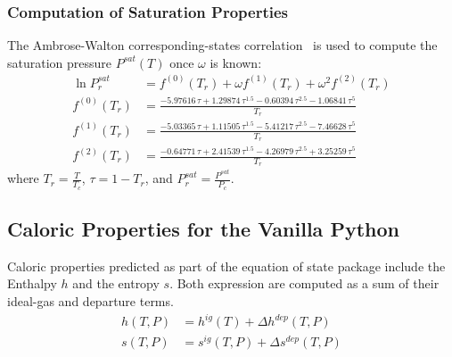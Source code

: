 \documentclass{article}
\begin{document}
\subsubsection{Computation of Saturation Properties}\label{sec:ambrose_walton}
The Ambrose-Walton corresponding-states correlation~\cite{ambrosewalton1989}
is used to compute the saturation pressure $P^{sat}(T)$ once $\omega$ is
known:
\begin{subequations}
\begin{align}
    \ln P_r^{sat} &= f^{(0)}(T_r) + \omega f^{(1)}(T_r) + \omega^2 f^{(2)}(T_r) \\
    f^{(0)}(T_r) &= \frac{-5.97616\,\tau + 1.29874\,\tau^{1.5} - 0.60394\,\tau^{2.5} - 1.06841\,\tau^{5}}{T_r} \\
    f^{(1)}(T_r) &= \frac{-5.03365\,\tau + 1.11505\,\tau^{1.5} - 5.41217\,\tau^{2.5} - 7.46628\,\tau^{5}}{T_r} \\
    f^{(2)}(T_r) &= \frac{-0.64771\,\tau + 2.41539\,\tau^{1.5} - 4.26979\,\tau^{2.5} + 3.25259\,\tau^{5}}{T_r}
\end{align}
\end{subequations}
where $T_r = \frac{T}{T_c}$, $\tau = 1 - T_r$, and $P_r^{sat} = \frac{P^{sat}}{P_c}$.
\subsection{Caloric Properties for the Vanilla Python}\label{sec:vanilla_caloric}
Caloric properties predicted as part of the equation of state package include the Enthalpy $h$ and the entropy $s$. Both expression are computed as a sum of their ideal-gas and departure terms.
\begin{subequations}
    \begin{align}
    h(T,P) &= h^{ig}(T) + \Delta h^{dep}(T,P)\label{eq:vanilla_enthalpy}\\
    s(T,P) &= s^{ig}(T,P) + \Delta s^{dep}(T,P)\label{eq:vanilla_entropy}
    \end{align}
\end{subequations}
\end{document}
